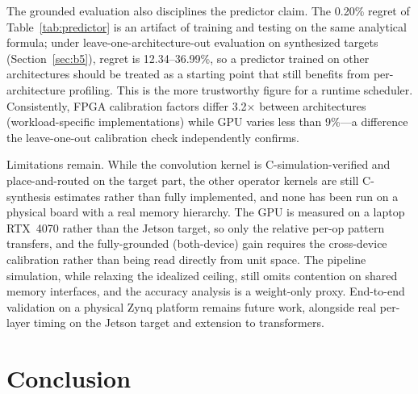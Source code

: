 \documentclass[runningheads]{llncs}
\begin{document}
The grounded evaluation also disciplines the predictor claim. The 0.20\% regret of Table~\ref{tab:predictor} is an artifact of training and testing on the same analytical formula; under leave-one-architecture-out evaluation on synthesized targets (Section~\ref{sec:b5}), regret is 12.34--36.99\%, so a predictor trained on other architectures should be treated as a starting point that still benefits from per-architecture profiling. This is the more trustworthy figure for a runtime scheduler. Consistently, FPGA calibration factors differ 3.2$\times$ between architectures (workload-specific implementations) while GPU varies less than 9\%---a difference the leave-one-out calibration check independently confirms.

Limitations remain. While the convolution kernel is C-simulation-verified and place-and-routed on the target part, the other operator kernels are still C-synthesis estimates rather than fully implemented, and none has been run on a physical board with a real memory hierarchy. The GPU is measured on a laptop RTX~4070 rather than the Jetson target, so only the relative per-op pattern transfers, and the fully-grounded (both-device) gain requires the cross-device calibration rather than being read directly from unit space. The pipeline simulation, while relaxing the idealized ceiling, still omits contention on shared memory interfaces, and the accuracy analysis is a weight-only proxy. End-to-end validation on a physical Zynq platform remains future work, alongside real per-layer timing on the Jetson target and extension to transformers.

\section{Conclusion}\label{sec:conclusion}
\end{document}
